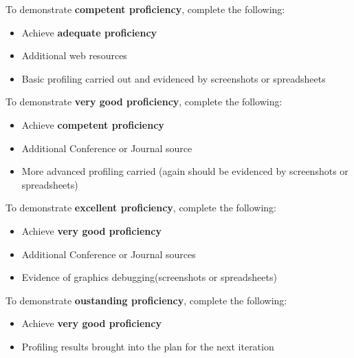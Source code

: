 \documentclass{../../../fal_assignment}
\begin{document}
To demonstrate \textbf{competent proficiency}, complete the following:
\begin{itemize}
	\item Achieve \textbf{adequate proficiency}
	\item Additional web resources
	\item Basic profiling carried out and evidenced by screenshots or spreadsheets
\end{itemize}

To demonstrate \textbf{very good proficiency}, complete the following:
\begin{itemize}
	\item Achieve \textbf{competent proficiency}
	\item Additional Conference or Journal source
	\item More advanced profiling carried (again should be evidenced by screenshots or spreadsheets)
\end{itemize}

To demonstrate \textbf{excellent proficiency}, complete the following:
\begin{itemize}
	\item Achieve \textbf{very good proficiency}
	\item Additional Conference or Journal sources
	\item Evidence of graphics debugging(screenshots or spreadsheets)
\end{itemize}

To demonstrate \textbf{oustanding proficiency}, complete the following:
\begin{itemize}
	\item Achieve \textbf{very good proficiency}
	\item Profiling results brought into the plan for the next iteration
\end{itemize}
\end{document}
